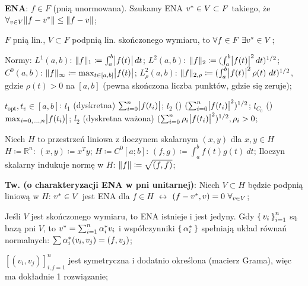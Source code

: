
\entry
\textbf{ENA}:
$f \in F$
(pnią unormowana).
Szukamy ENA
$v^{*} \in V \subset F$ takiego, że
$\forall_{v \in V} \|f - v^{*}\| \leq \|f-v\|$;

\entry
$F$ pnią lin.,
$V \subset F$ podpnią lin. skończonego wymiaru, to
$\forall{f \in F} \ \exists{\enain{v}{V}}$;

\entry
Normy:
\subentry
$L^1(a,b)$:
$\|f\|_1 \coloneqq \int^b_a\abs{f(t)} dt$;
\subentry
$L^2(a,b)$:
$\|f\|_2 \coloneqq (\int^b_a\abs{f(t)}^2 dt)^{1/2}$;
\subentry
$C^0(a,b)$:
$\|f\|_\infty \coloneqq \max_{t \in [a,b]} \abs{f(t)}$;
\subentry
$L^2_\rho(a,b)$:
$\|f\|_{2, \rho} \coloneqq (\int^b_a\abs{f(t)}^2 \rho(t) \ dt)^{1/2}$,
gdzie
$\rho(t) > 0$ na $[a,b]$
(pewna skończona liczba punktów, gdzie się zeruje);


\entry
$t_{\text{opt}}, t_v \in [a,b]$:
\subentry
$l_1$ (dyskretna)
$\sum^n_{i=0} \abs{f(t_i)}$;
\subentry
$l_2$ (\dittotikz)
$(\sum^n_{i=0} \abs{f(t_i)}^2)^{1/2}$;
\subentry
$l_{C_0}$ (\dittotikz)
$\max_{i = 0,\ldots,n} \abs{f(t_i)}$;
\subentry
$l_2$ (dyskretna ważona)
$(\sum^n_{i=0} \rho_i\abs{f(t_i)}^2)^{1/2}, \rho_i>0$;

\entry
Niech $H$ to przestrzeń liniowa z iloczynem skalarnym
$(x,y)$ dla $x, y \in H$
\subentry
$H \coloneqq \mathbb{R}^n$:
$(x,y) \coloneqq x^T y$;
\subentry
$H \coloneqq C^0[a;b]$:
$(f,g) \coloneqq \int^b_a f(t)g(t) \ dt$;
\subentry
Iloczyn skalarny indukuje normę w $H$:
$\|f\| \coloneqq \sqrt{(f,f)}$;

\entry
\textbf{Tw. (o charakteryzacji ENA w pni unitarnej)}:
Niech $V \subset H$ będzie podpnią liniową w $H$:
$v^{*} \in V$ jest ENA dla $f \in H$
$\leftrightarrow$
$(f - \ena{v}, v) = 0 \ \forallin{v}{V}$;

\entry
Jeśli $V$ jest skończonego wymiaru, to ENA istnieje i jest jedyny.
Gdy $\set{v_i}^n_{i=1}$ są bazą pni $V$, to
$v^{*} = \sum^n_{i=1} \alpha^{*}_i v_i$
i współczynniki $\set{\alpha^{*}_i}$
spełniają układ równań normalnych:
$\sum \alpha^{*}_i (v_i, v_j) = (f, v_j)$;

\entry
$[(v_i, v_j)]^n_{i,j=1}$
jest symetryczna i dodatnio określona (macierz Grama),
więc ma dokładnie 1 rozwiązanie;

